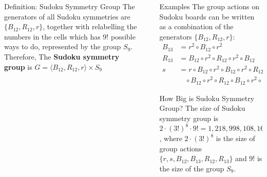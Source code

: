 \documentclass[final]{beamer}
\newlength{\sepwidth}
\newlength{\colwidth}
\newcommand{\separatorcolumn}{\begin{column}{\sepwidth}\end{column}}
\begin{document}
\begin{frame}[t]
\begin{columns}[t]
\begin{column}{\colwidth}
    \begin{alertblock}{\Large Definition: Sudoku Symmetry Group}
        The generators of all Sudoku symmetries are $\{B_{12},R_{12}, r \}$, together with relabelling the numbers in the cells which has $9!$ possible ways to do, represented by the group $S_9$. Therefore, The \textbf{Sudoku symmetry group} is $G = \langle B_{12},R_{12}, r \rangle \times S_9$
    \end{alertblock}
    

\end{column}

\separatorcolumn

\begin{column}{\colwidth}

    \begin{block}{\Large Examples}
        \large The group actions on Sudoku boards can be written as a combination of the generators $\{B_{12},R_{12}, r \}$:
        \begin{align*}
            B_{13} &= r^2 \circ B_{12} \circ r^2 \\
            R_{13} &= B_{12} \circ r^2 \circ R_{12} \circ r^2 \circ B_{12}\\
            s &= r \circ B_{12} \circ r^2 \circ B_{12} \circ r^2 \circ R_{12} \circ B_{12} \circ r^2 \circ R_{12} \circ B_{12} \circ r^2 \circ R_{12} \circ B_{12} \circ r^2 \circ R_{12} \\  & \ \ \ \ \circ B_{12} \circ r^2 \circ R_{12} \circ B_{12} \circ r^2 \circ R_{12} \circ B_{12} \circ R_{12} \circ r^2 \circ R_{12} \circ B_{12} \circ R_{12}
        \end{align*}
        
    \end{block}

    \begin{alertblock}{\Large How Big is Sudoku Symmetry Group?}
        The size of Sudoku symmetry group is $2 \cdot (3!)^8 \cdot 9! =1,218,998,108,160$, where $2 \cdot (3!)^8 $ is the size of group actions $\{ r,s,B_{12},B_{13},R_{12},R_{13} \}$ and $9!$ is the size of the group $S_9$.
    \end{alertblock}



\end{column}
\end{columns}
\end{frame}
\end{document}
